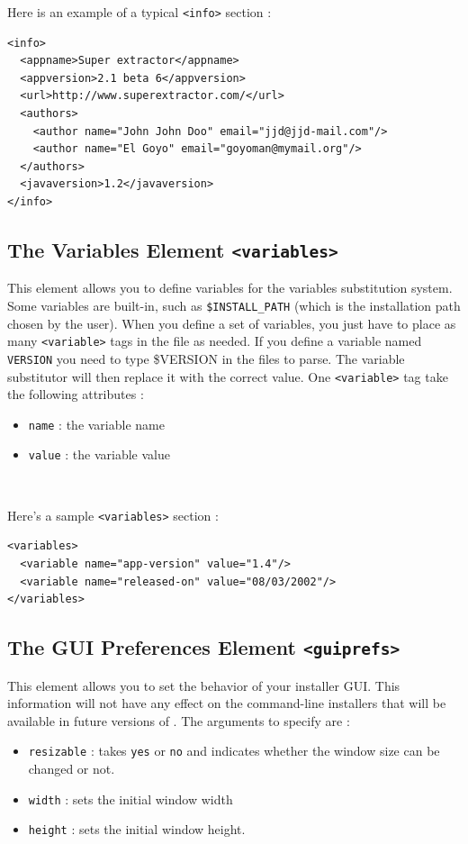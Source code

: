 Here is an example of a typical \texttt{<info>} section :\\
\footnotesize
\begin{verbatim}
<info>
  <appname>Super extractor</appname>
  <appversion>2.1 beta 6</appversion>
  <url>http://www.superextractor.com/</url>
  <authors>
    <author name="John John Doo" email="jjd@jjd-mail.com"/>
    <author name="El Goyo" email="goyoman@mymail.org"/>
  </authors>
  <javaversion>1.2</javaversion>
</info>
\end{verbatim}
\normalsize

\subsection{The Variables Element \texttt{<variables>}}
\label{variables-element}

This element allows you to define variables for the variables
substitution system. Some variables are built-in, such as
\texttt{\$INSTALL\_PATH} (which is the installation path chosen by the
user). When you define a set of variables, you just have to place as
many \texttt{<variable>} tags in the file as needed. If you define a
variable named \texttt{VERSION} you need to type \$VERSION in the files
to parse. The variable substitutor will then replace it with the correct
value. One \texttt{<variable>} tag take the following attributes :
\begin{itemize}

  \item \texttt{name} : the variable name
  \item \texttt{value} : the variable value

\end{itemize}\

Here's a sample \texttt{<variables>} section :\\
\footnotesize
\begin{verbatim}
<variables>
  <variable name="app-version" value="1.4"/>
  <variable name="released-on" value="08/03/2002"/>
</variables>
\end{verbatim}
\normalsize

\subsection{The GUI Preferences Element \texttt{<guiprefs>}}
\label{guiprefs-element}

This element allows you to set the behavior of your installer GUI. This
information will not have any effect on the command-line installers that will be
available in future versions of \IzPack. The arguments to specify are :
\begin{itemize}

  \item \texttt{resizable} : takes \texttt{yes} or \texttt{no} and indicates
  whether the window size can be changed or not.
  \item \texttt{width} : sets the initial window width
  \item \texttt{height} : sets the initial window height.
  
\end{itemize}\

